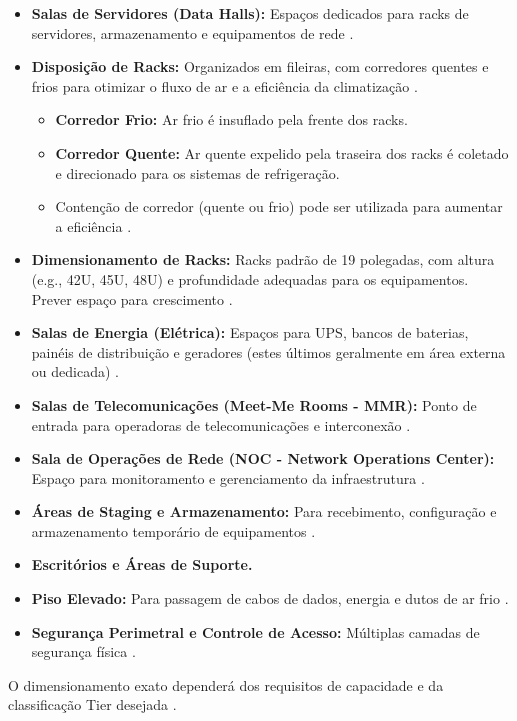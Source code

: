 \documentclass[
	12pt,				%
	oneside,			%
	a4paper,			%
	english,			%
	brazil				%
	]{abntex2unama}
\begin{document}
\begin{itemize}
	\item \textbf{Salas de Servidores (Data Halls):} Espaços dedicados para racks de servidores, armazenamento e equipamentos de rede \cite{cooling_technologies}.
	\item \textbf{Disposição de Racks:} Organizados em fileiras, com corredores quentes e frios para otimizar o fluxo de ar e a eficiência da climatização \cite{liquid_cooling}.
	      \begin{itemize}
		      \item \textbf{Corredor Frio:} Ar frio é insuflado pela frente dos racks.
		      \item \textbf{Corredor Quente:} Ar quente expelido pela traseira dos racks é coletado e direcionado para os sistemas de refrigeração.
		      \item Contenção de corredor (quente ou frio) pode ser utilizada para aumentar a eficiência \cite{energy_efficiency}.
	      \end{itemize}
	\item \textbf{Dimensionamento de Racks:} Racks padrão de 19 polegadas, com altura (e.g., 42U, 45U, 48U) e profundidade adequadas para os equipamentos. Prever espaço para crescimento \cite{capacity_planning}.
	\item \textbf{Salas de Energia (Elétrica):} Espaços para UPS, bancos de baterias, painéis de distribuição e geradores (estes últimos geralmente em área externa ou dedicada) \cite{power_distribution}.
	\item \textbf{Salas de Telecomunicações (Meet-Me Rooms - MMR):} Ponto de entrada para operadoras de telecomunicações e interconexão \cite{datacenter_networking}.
	\item \textbf{Sala de Operações de Rede (NOC - Network Operations Center):} Espaço para monitoramento e gerenciamento da infraestrutura \cite{datacenter_monitoring}.
	\item \textbf{Áreas de Staging e Armazenamento:} Para recebimento, configuração e armazenamento temporário de equipamentos \cite{dcim_systems}.
	\item \textbf{Escritórios e Áreas de Suporte.}
	\item \textbf{Piso Elevado:} Para passagem de cabos de dados, energia e dutos de ar frio \cite{cooling_technologies}.
	\item \textbf{Segurança Perimetral e Controle de Acesso:} Múltiplas camadas de segurança física \cite{datacenter_security}.
\end{itemize}
O dimensionamento exato dependerá dos requisitos de capacidade e da classificação Tier desejada \cite{reliability_engineering}.
\end{document}
